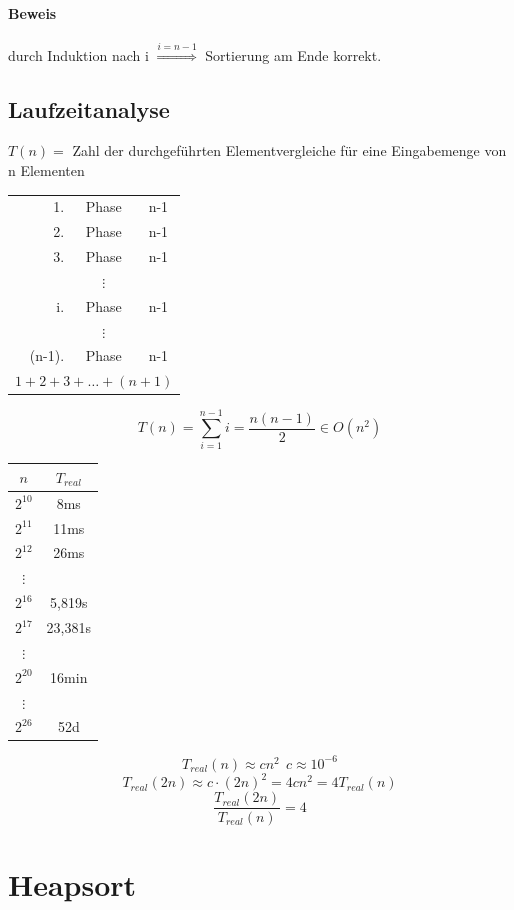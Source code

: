 \paragraph{Beweis} durch Induktion nach i $\overset{i=n-1}{\Longrightarrow}$ Sortierung am Ende korrekt.


\pagebreak

\subsection{Laufzeitanalyse}

$T(n) =$ Zahl der durchgeführten Elementvergleiche für eine Eingabemenge von n Elementen\\

\begin{tabular}{rcc}
	1.&Phase & n-1 \\
	2.&Phase & n-1 \\
	3.&Phase & n-1 \\
	 & $\vdots$ &  \\
	i.& Phase & n-1 \\
	 & $\vdots$ &  \\
	(n-1).&Phase & n-1 \\ \hline
	\multicolumn{3}{c}{$1+2+3+\ldots+(n+1)$}
\end{tabular}
\[ T(n)=\sum_{i=1}^{n-1} i = \frac{n(n-1)}{2}\in O(n^2) \]
\begin{tabular}{c|c}
	$n$ & $T_{real}$ \\ \hline
	$2^{10}$ & 8ms \\
	$2^{11}$ & 11ms \\
	$2^{12}$ & 26ms \\
	$\vdots$ &  \\
	$2^{16}$ & 5,819s \\
	$2^{17}$ & 23,381s \\
	$\vdots$ &  \\
	$2^{20}$ & 16min \\
	$\vdots$ &  \\
	$2^{26}$ & 52d 
\end{tabular}
\[ T_{real}(n)\approx cn^2~~ c\approx10^{-6}\]
\[T_{real} (2n) \approx c \cdot (2n)^2 = 4 cn^2 = 4T_{real}(n) \]
\[\frac{T_{real}(2n)}{T_{real}(n)} = 4 \]



\section{Heapsort}
\label{sec:heapsort}

